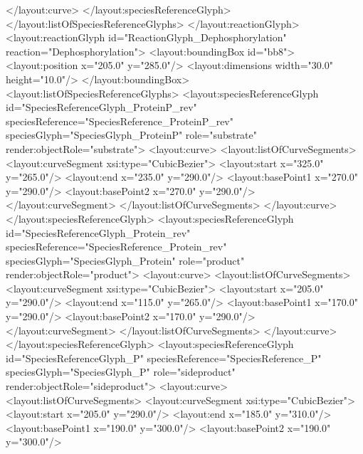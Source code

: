 {\begin{example}
        </layout:curve>
       </layout:speciesReferenceGlyph>
      </layout:listOfSpeciesReferenceGlyphs>
     </layout:reactionGlyph>
     <layout:reactionGlyph id="ReactionGlyph_Dephosphorylation"
                           reaction="Dephosphorylation">
      <layout:boundingBox id="bb8">
       <layout:position x="205.0" y="285.0"/>
       <layout:dimensions width="30.0" height="10.0"/>
      </layout:boundingBox>
      <layout:listOfSpeciesReferenceGlyphs>
       <layout:speciesReferenceGlyph id="SpeciesReferenceGlyph_ProteinP_rev" 
                              speciesReference="SpeciesReference_ProteinP_rev"
                              speciesGlyph="SpeciesGlyph_ProteinP" 
                              role="substrate"
                              render:objectRole="substrate">
        <layout:curve>
         <layout:listOfCurveSegments>
          <layout:curveSegment xsi:type="CubicBezier">
           <layout:start x="325.0" y="265.0"/>
           <layout:end x="235.0" y="290.0"/>
           <layout:basePoint1 x="270.0" y="290.0"/>
           <layout:basePoint2 x="270.0" y="290.0"/>
          </layout:curveSegment>
         </layout:listOfCurveSegments>
        </layout:curve>
       </layout:speciesReferenceGlyph>
       <layout:speciesReferenceGlyph id="SpeciesReferenceGlyph_Protein_rev"
                              speciesReference="SpeciesReference_Protein_rev" 
                              speciesGlyph="SpeciesGlyph_Protein" 
                              role="product" 
                              render:objectRole="product">
        <layout:curve>
         <layout:listOfCurveSegments>
          <layout:curveSegment xsi:type="CubicBezier">
           <layout:start x="205.0" y="290.0"/>
           <layout:end x="115.0" y="265.0"/>
           <layout:basePoint1 x="170.0" y="290.0"/>
           <layout:basePoint2 x="170.0" y="290.0"/>
          </layout:curveSegment>
         </layout:listOfCurveSegments>
        </layout:curve>
       </layout:speciesReferenceGlyph>
       <layout:speciesReferenceGlyph id="SpeciesReferenceGlyph_P"
                              speciesReference="SpeciesReference_P" 
                              speciesGlyph="SpeciesGlyph_P" 
                              role="sideproduct" 
                              render:objectRole="sideproduct">
        <layout:curve>
         <layout:listOfCurveSegments>
          <layout:curveSegment xsi:type="CubicBezier">
           <layout:start x="205.0" y="290.0"/>
           <layout:end x="185.0" y="310.0"/>
           <layout:basePoint1 x="190.0" y="300.0"/>
           <layout:basePoint2 x="190.0" y="300.0"/>

\end{example}}
